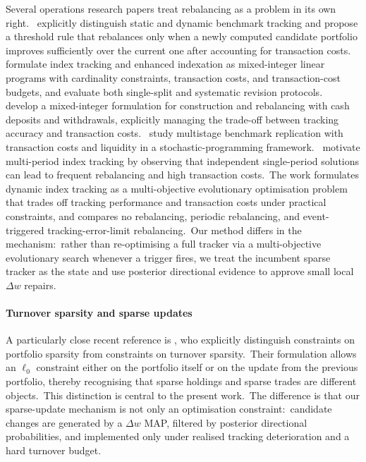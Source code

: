 \documentclass[11pt]{article}
\begin{document}
Several operations research papers treat rebalancing as a problem in its own right.\ \citet{Gaivoronski2005} explicitly distinguish static and dynamic benchmark tracking and propose a threshold rule that rebalances only when a newly computed candidate portfolio improves sufficiently over the current one after accounting for transaction costs.\ \citet{CanakgozBeasley2009} formulate index tracking and enhanced indexation as mixed-integer linear programs with cardinality constraints, transaction costs, and transaction-cost budgets, and evaluate both single-split and systematic revision protocols.\ \citet{Strub2018} develop a mixed-integer formulation for construction and rebalancing with cash deposits and withdrawals, explicitly managing the trade-off between tracking accuracy and transaction costs.\ \citet{BarroCanestrelli2009} study multistage benchmark replication with transaction costs and liquidity in a stochastic-programming framework.\  \citet{HuangZhangZhao2021} motivate multi-period index tracking by observing that independent single-period solutions can lead to frequent rebalancing and high transaction costs.\ The work \citet{Chiam2013} formulates dynamic index tracking as a multi-objective evolutionary optimisation problem that trades off tracking performance and transaction costs under practical constraints, and compares no rebalancing, periodic rebalancing, and event-triggered tracking-error-limit rebalancing.\ Our method differs in the mechanism:\ rather than re-optimising a full tracker via a multi-objective evolutionary search whenever a trigger fires, we treat the incumbent sparse tracker as the state and use posterior directional evidence to approve small local $\Delta w$ repairs.


\paragraph{Turnover sparsity and sparse updates}

A particularly close recent reference is \citet{YamagataOno2024}, who explicitly distinguish constraints on portfolio sparsity from constraints on turnover sparsity.\ Their formulation allows an $\ell_0$ constraint either on the portfolio itself or on the update from the previous portfolio, thereby recognising that sparse holdings and sparse trades are different objects.\ This distinction is central to the present work.\ The difference is that our sparse-update mechanism is not only an optimisation constraint:\ candidate changes are generated by a $\Delta w$ MAP, filtered by posterior directional probabilities, and implemented only under realised tracking deterioration and a hard turnover budget.
\end{document}
